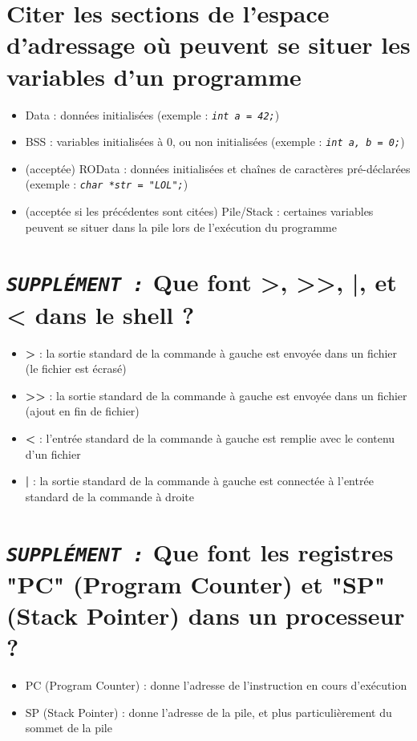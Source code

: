 \documentclass[11pt,a4paper]{article}
\begin{document}
\bigskip

\section{Citer les sections de l'espace d'adressage où peuvent se situer les variables d'un programme}

\bigskip
\begin{itemize}
\item Data : données initialisées (exemple : \textit{\texttt{int a = 42;}})
\item BSS : variables initialisées à 0, ou non initialisées (exemple : \textit{\texttt{int a, b = 0;}})
\item (acceptée) ROData : données initialisées et chaînes de caractères pré-déclarées \\ (exemple : \textit{\texttt{char *str = "LOL";}})
\item (acceptée si les précédentes sont citées) Pile/Stack : certaines variables peuvent se situer dans la pile lors de l'exécution du programme
\end{itemize}
\bigskip

\section{\textit{\texttt{SUPPL\'EMENT :}} Que font >, >{}>, |, et < dans le shell ?}

\bigskip
\begin{itemize}
\item \textbf{>} : la sortie standard de la commande à gauche est envoyée dans un fichier (le fichier est écrasé)
\item \textbf{>{}>} : la sortie standard de la commande à gauche est envoyée dans un fichier (ajout en fin de fichier)
\item \textbf{<} : l'entrée standard de la commande à gauche est remplie avec le contenu d'un fichier
\item \textbf{|} : la sortie standard de la commande à gauche est connectée à l'entrée standard de la commande à droite

\end{itemize}
\bigskip

\section{\textit{\texttt{SUPPL\'EMENT :}} Que font les registres "PC" (Program Counter) et "SP" (Stack Pointer) dans un processeur ?}

\bigskip
\begin{itemize}
\item PC (Program Counter) : donne l'adresse de l'instruction en cours d'exécution
\item SP (Stack Pointer) : donne l'adresse de la pile, et plus particulièrement du sommet de la pile
\end{itemize}
\end{document}
